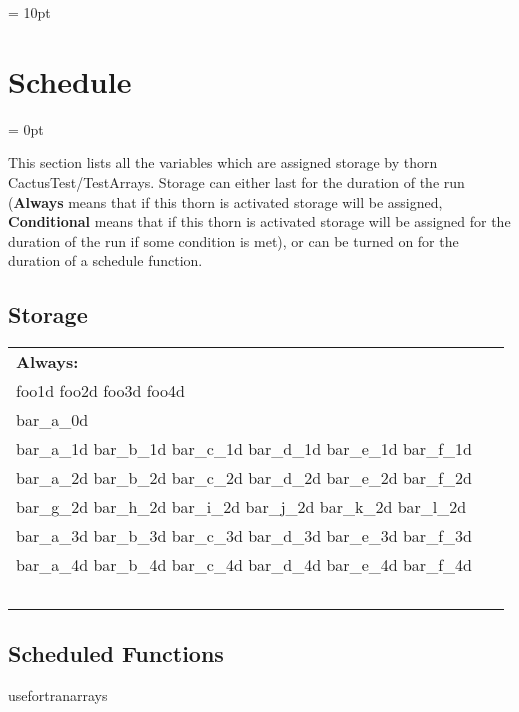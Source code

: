 \vspace{5mm}\parskip = 10pt 

\section{Schedule} 


\parskip = 0pt


\noindent This section lists all the variables which are assigned storage by thorn CactusTest/TestArrays.  Storage can either last for the duration of the run ({\bf Always} means that if this thorn is activated storage will be assigned, {\bf Conditional} means that if this thorn is activated storage will be assigned for the duration of the run if some condition is met), or can be turned on for the duration of a schedule function.


\subsection*{Storage}

\hspace{5mm}

 \begin{tabular*}{160mm}{ll} 

{\bf Always:}&  ~ \\ 
 foo1d foo2d foo3d foo4d & ~\\ 
 bar\_a\_0d & ~\\ 
 bar\_a\_1d bar\_b\_1d bar\_c\_1d bar\_d\_1d bar\_e\_1d bar\_f\_1d & ~\\ 
 bar\_a\_2d bar\_b\_2d bar\_c\_2d bar\_d\_2d bar\_e\_2d bar\_f\_2d & ~\\ 
 bar\_g\_2d bar\_h\_2d bar\_i\_2d bar\_j\_2d bar\_k\_2d bar\_l\_2d & ~\\ 
 bar\_a\_3d bar\_b\_3d bar\_c\_3d bar\_d\_3d bar\_e\_3d bar\_f\_3d & ~\\ 
 bar\_a\_4d bar\_b\_4d bar\_c\_4d bar\_d\_4d bar\_e\_4d bar\_f\_4d & ~\\ 
~ & ~\\ 
\end{tabular*} 


\subsection*{Scheduled Functions}
\vspace{5mm}


\hspace{5mm} usefortranarrays 

